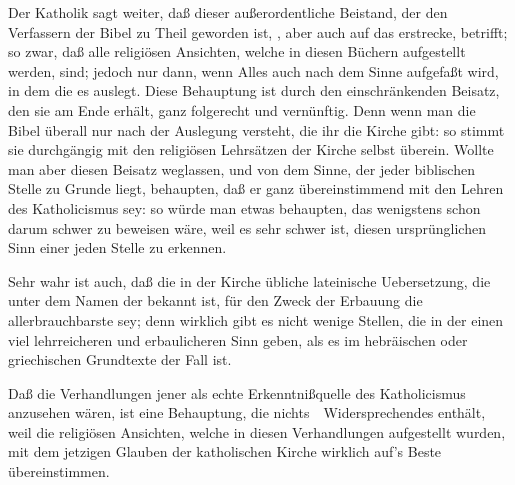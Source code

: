 \begin{aufza}
\begin{aufzb}
\item Der Katholik sagt weiter, daß dieser außerordentliche Beistand, der den Verfassern der Bibel zu Theil geworden ist, , aber auch auf  das erstrecke,  betrifft; so zwar, daß alle religiösen Ansichten, welche in diesen Büchern aufgestellt werden,  sind; jedoch nur dann, wenn Alles auch nach dem Sinne aufgefaßt wird, in dem die  es auslegt. Diese Behauptung ist durch den einschränkenden Beisatz, den sie am Ende erhält, ganz folgerecht und vernünftig. Denn wenn man die Bibel überall nur nach der Auslegung versteht, die ihr die Kirche gibt: so stimmt sie durchgängig mit den religiösen Lehrsätzen der Kirche selbst überein. Wollte man aber diesen Beisatz weglassen, und von dem  Sinne, der jeder biblischen Stelle zu Grunde liegt, behaupten, daß er ganz übereinstimmend mit den Lehren des Katholicismus sey: so würde man etwas behaupten, das wenigstens schon darum schwer zu beweisen wäre, weil es sehr schwer ist, diesen ursprünglichen Sinn einer jeden Stelle zu erkennen.
\item Sehr wahr ist auch, daß die in der Kirche übliche lateinische Uebersetzung, die unter dem Namen der  bekannt ist, für den Zweck der Erbauung die allerbrauchbarste sey; denn wirklich gibt es nicht wenige Stellen, die in der  einen viel lehrreicheren und erbaulicheren Sinn geben, als es im hebräischen oder griechischen Grundtexte der Fall ist.
\end{aufzb}
\item Daß die Verhandlungen jener  als echte Erkenntnißquelle des Katholicismus anzusehen wären, ist eine Behauptung, die nichts~\ Widersprechendes enthält, weil die religiösen Ansichten, welche in diesen Verhandlungen aufgestellt wurden, mit dem jetzigen Glauben der katholischen Kirche wirklich auf's Beste übereinstimmen.
\end{aufza}

